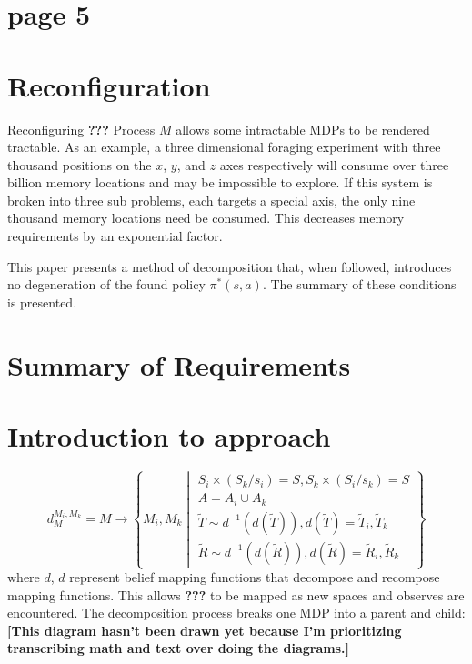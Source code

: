 \section*{page 5}

\section{Reconfiguration}

Reconfiguring \textbf{???} Process $M$ allows some intractable MDPs to be rendered tractable. 
As an example, a three dimensional foraging experiment with three thousand positions on the $x$, $y$, and $z$
axes respectively will consume over three billion memory locations and may be impossible to explore. If this system is
broken into three sub problems, each targets a special axis, the only nine thousand memory locations need be consumed. This decreases memory requirements by an exponential factor.

This paper presents a method of decomposition that, when followed, introduces no degeneration of the found policy $\pi^{*}(s,a)$.
The summary of these conditions is presented.

\section*{Summary of Requirements}

\section*{Introduction to approach}

\begin{equation*}
d^{M_i,M_k}_{M} = M \longrightarrow \left\{    M_i, M_k \middle|
\begin{array}{l}
S_i\times(S_k/s_i)=S, S_k\times(S_i/s_k)=S\\
A=A_i \cup A_k\\
\tilde{T}\sim d^{-1}(d(\tilde{T})),d(\tilde{T})=\tilde{T}_i, \tilde{T}_k\\
\tilde{R}\sim d^{-1}(d(\tilde{R})), d(\tilde{R})=\tilde{R}_i,\tilde{R}_k
\end{array}
 \right\}
\end{equation*}
where $d$, $d$ represent belief mapping functions that decompose and recompose mapping functions. This allows   \textbf{???} to be mapped as new spaces and observes are encountered. The decomposition process breaks one MDP into a parent and child:\\

\textbf{[This diagram hasn't been drawn yet because I'm prioritizing transcribing math and text over doing the diagrams.]}
